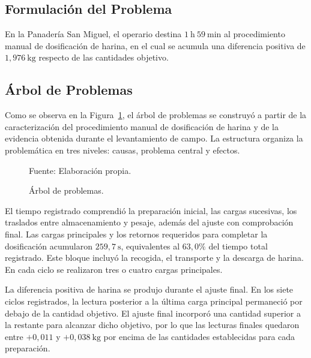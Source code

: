 \subsection{Formulación del Problema}
\label{subsec:formulacion_problema}

En la Panadería San Miguel, el operario destina $1\ \mathrm{h}\ 59\ \mathrm{min}$ al
procedimiento manual de dosificación de harina, en el cual se acumula una
diferencia positiva de $1{,}976\ \mathrm{kg}$ respecto de las cantidades
objetivo.


\subsection{Árbol de Problemas}
\label{subsec:arbol_problemas}

Como se observa en la Figura~\ref{fig:arbol_problemas}, el árbol de problemas se construyó a partir de la caracterización del procedimiento manual de dosificación de harina y de la evidencia obtenida durante el levantamiento de campo. La estructura organiza la problemática en tres niveles: causas, problema central y efectos.

\begin{figure}[H]
    \centering
    \resizebox{\textwidth}{!}{%
    }
    \caption{Árbol de problemas.}
    \label{fig:arbol_problemas}
    \vspace{0.2em}
    {\footnotesize Fuente: Elaboración propia.}
\end{figure}

El tiempo registrado comprendió la preparación inicial, las cargas
sucesivas, los traslados entre almacenamiento y pesaje, además del ajuste
con comprobación final. Las cargas principales y los retornos requeridos
para completar la dosificación acumularon $259{,}7\ \mathrm{s}$,
equivalentes al $63{,}0\%$ del tiempo total registrado. Este bloque
incluyó la recogida, el transporte y la descarga de harina. En cada ciclo
se realizaron tres o cuatro cargas principales.

La diferencia positiva de harina se produjo durante el ajuste final. En
los siete ciclos registrados, la lectura posterior a la última carga
principal permaneció por debajo de la cantidad objetivo. El ajuste final
incorporó una cantidad superior a la restante para alcanzar dicho objetivo,
por lo que las lecturas finales quedaron entre $+0{,}011$ y
$+0{,}038\ \mathrm{kg}$ por encima de las cantidades establecidas para
cada preparación.

